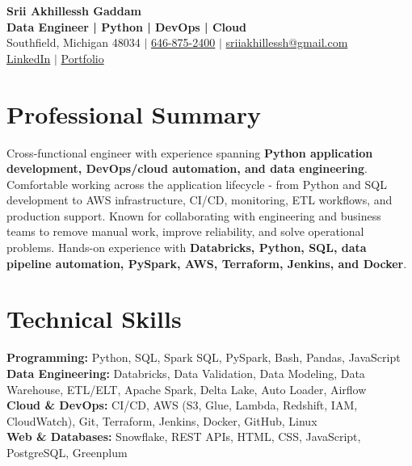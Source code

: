 \documentclass[letterpaper,10pt]{article}
\begin{document}
\fontsize{9.35pt}{10.45pt}\selectfont

\begin{center}
    {\LARGE \textbf{Srii Akhillessh Gaddam}} \\[-1pt]
    \textbf{Data Engineer | Python | DevOps | Cloud} \\[2pt]
    Southfield, Michigan 48034 $|$
    \href{tel:6468752400}{646-875-2400} $|$
    \href{mailto:sriiakhillessh@gmail.com}{sriiakhillessh@gmail.com} \\[1pt]
    \href{https://www.linkedin.com/in/srii-akhiilessh-gaddam-b48668191/}{LinkedIn} $|$
    \href{https://sriiakhillesshg.github.io/portfolio/}{Portfolio}
\end{center}
\vspace{-8pt}

\section{Professional Summary}
\small{Cross-functional engineer with experience spanning \textbf{Python application development, DevOps/cloud automation, and data engineering}. Comfortable working across the application lifecycle - from Python and SQL development to AWS infrastructure, CI/CD, monitoring, ETL workflows, and production support. Known for collaborating with engineering and business teams to remove manual work, improve reliability, and solve operational problems. Hands-on experience with \textbf{Databricks, Python, SQL, data pipeline automation, PySpark, AWS, Terraform, Jenkins, and Docker}.}

\section{Technical Skills}
\small{
\textbf{Programming:} Python, SQL, Spark SQL, PySpark, Bash, Pandas, JavaScript \\
\textbf{Data Engineering:} Databricks, Data Validation, Data Modeling, Data Warehouse, ETL/ELT, Apache Spark, Delta Lake, Auto Loader, Airflow \\
\textbf{Cloud \& DevOps:} CI/CD, AWS (S3, Glue, Lambda, Redshift, IAM, CloudWatch), Git, Terraform, Jenkins, Docker, GitHub, Linux \\
\textbf{Web \& Databases:} Snowflake, REST APIs, HTML, CSS, JavaScript, PostgreSQL, Greenplum
}
\end{document}
